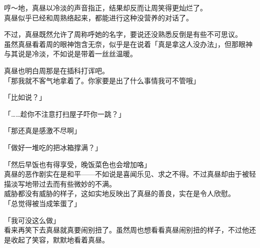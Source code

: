 哼～地，真昼以冷淡的声音指正，结果却反而让周笑得更灿烂了。\\

真昼似乎已经和周熟络起来，都能进行这种没营养的对话了。

不过，真昼既然允许了周称呼她的名字，要说还没熟悉反倒是有些不可思议。\\

虽然真昼看着周的眼神饱含无奈，似乎是在说着「真是拿这人没办法」，但那眼神与其说是冷淡，不如说是带着一丝丝温暖。

真昼也明白周那是在插科打诨吧。\\

「那我就不客气地拿着了。你家要是出了什么事情我可不管哦」

「比如说？」

「……趁你不注意打扫屋子吓你一跳？」

「那还真是感激不尽啊」

「做好一堆吃的把冰箱撑满？」

「然后早饭也有得享受，晚饭菜色也会增加咯」\\

真昼的恶作剧实在是和平——不如说是喜闻乐见、求之不得。不过真昼却由于被轻描淡写地带过去而有些微妙的不满。\\

威胁都没有威胁的样子，这如实地反映出了真昼的善良，实在是令人欣慰。\\

「总觉得被当成笨蛋了」

「我可没这么做」\\

看来再笑下去真昼就真要闹别扭了。虽然周也想看看真昼闹别扭的样子，不过他还是收起了笑容，默默地看着真昼。
